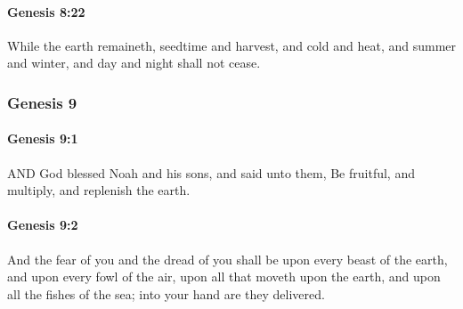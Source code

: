 		\paragraph{Genesis 8:22} %
			\label{GENESIS-8-22}

			While the earth remaineth, seedtime and harvest, and cold and heat, and summer and winter, and day and night shall not cease.


	\subsubsection{Genesis 9} %
		\label{GENESIS-9}
		
		\paragraph{Genesis 9:1} %
			\label{GENESIS-9-1}

			AND God blessed Noah and his sons, and said unto them, Be fruitful, and multiply, and replenish the earth.


		\paragraph{Genesis 9:2} %
			\label{GENESIS-9-2}

			And the fear of you and the dread of you shall be upon every beast of the earth, and upon every fowl of the air, upon all that moveth upon the earth, and upon all the fishes of the sea; into your hand are they delivered. 

